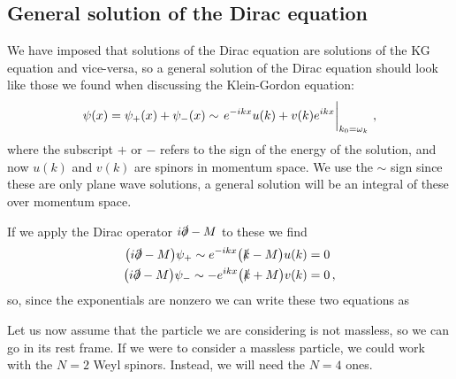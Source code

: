 \documentclass[main.tex]{subfiles}
\begin{document}

\subsection{General solution of the Dirac equation}

We have imposed that solutions of the Dirac equation are solutions of the KG equation and vice-versa, so a general solution of the Dirac equation should look like those we found when discussing the Klein-Gordon equation: 
%
\begin{align}
\psi (x) = \psi_{+ } (x) + \psi_{-} (x) 
\sim \eval{e^{-ikx} u(k) + v(k) e^{ikx}}_{k_0 = \omega_{k}}
\,,
\end{align}
%
where the subscript \(+\) or \(-\) refers to the sign of the energy of the solution, and now \(u(k)\) and \(v(k)\) are spinors in momentum space. 
We use the \(\sim\) sign since these are only plane wave solutions, a general solution will be an integral of these over momentum space.

If we apply the Dirac operator \(i \slashed{\partial} - M\) to these we find 
%
\begin{align}
\qty( i \slashed{\partial} - M) \psi_{+} \sim e^{-ikx} \qty(\slashed{k} - M) u(k) &= 0 \\
\qty( i \slashed{\partial} - M) \psi_{-} \sim -e^{ikx} \qty(\slashed{k} + M) v(k) &= 0
\,,
\end{align}
%
so, since the exponentials are nonzero we can write these two equations as 
%

Let us now assume that the particle we are considering is not massless, so we can go in its rest frame. 
If we were to consider a massless particle, we could work with the \(N=2\) Weyl spinors. Instead, we will need the \(N=4\) ones. 
\end{document}
